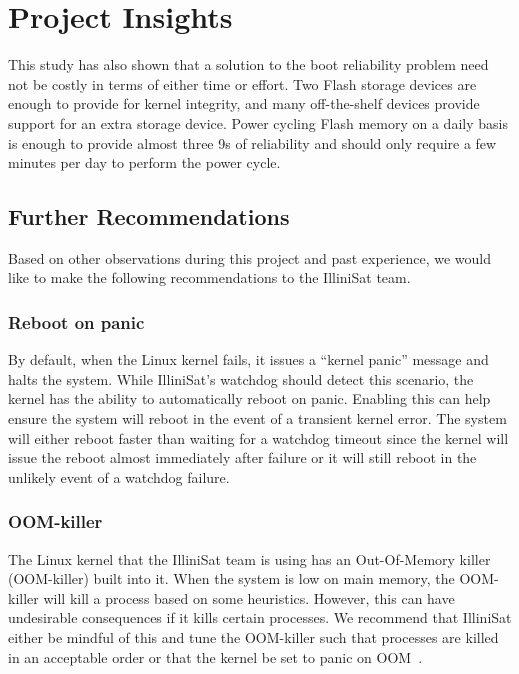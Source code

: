 \section{Project Insights}\label{sec:insights}

This study has also shown that a solution to the boot reliability problem need not be costly in terms of either time or effort.  Two Flash storage devices are enough to provide for kernel integrity, and many off-the-shelf devices provide support for an extra storage device.  Power cycling Flash memory on a daily basis is enough to provide almost three 9s of reliability and should only require a few minutes per day to perform the power cycle.

\subsection{Further Recommendations}
Based on other observations during this project and past experience, we would
like to make the following recommendations to the IlliniSat team.

\subsubsection{Reboot on panic} By default, when the Linux kernel fails, it
issues a ``kernel panic'' message and halts the system.  While IlliniSat's
watchdog should detect this scenario, the kernel has the ability to
automatically reboot on panic.  Enabling this can help ensure the system will
reboot in the event of a transient kernel error. The system will either reboot
faster than waiting for a watchdog timeout since the kernel will issue the
reboot almost immediately after failure or it will still reboot in the unlikely
event of a watchdog failure.

\subsubsection{OOM-killer} The Linux kernel that the IlliniSat team is using
has an Out-Of-Memory killer (OOM-killer) built into it. When the system is 
low on main memory, the OOM-killer will kill a process based on some heuristics.
However, this can have undesirable consequences if it kills certain processes.
We recommend that IlliniSat either be mindful of this and tune the OOM-killer
such that processes are killed in an acceptable order or that the kernel be set
to panic on OOM~\cite{oracleoom}.


